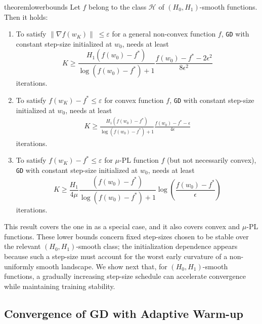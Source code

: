 \documentclass[a4paper,11pt]{article}
\newcommand{\algname}[1]{\texttt{#1}}
\newcommand{\1}{\mathbbm{1}}
\theoremstyle{plain}
\begin{document}
\begin{restatable}{theorem}{lowerbounds}\label{th:lower_bounds}
    Let $f$ belong to the class $\mathcal{H}$ of $(H_0,H_1)$-smooth functions. Then it holds:
\begin{enumerate}
    \item To satisfy $\|\nabla f(w_K)\| \;\leq \varepsilon$ for a general non-convex function $f$, \algname{GD} with constant step-size initialized at $w_0$, needs at least
    \begin{equation*}
        K \geq \frac{H_1 (f(w_0)-f^*)}{\log (f(w_0)-f^*)+1} \frac{f(w_0)-f^*-2 \epsilon^2}{8 \epsilon^2}
    \end{equation*}
    iterations.
     
    
    \item To satisfy $f(w_K)-f^* \leq \varepsilon$ for convex function $f$, \algname{GD} with constant step-size initialized at $w_0$, needs at least
    \begin{align*}
    K \geq \frac{H_1 (f(w_0)-f^*)}{\log(f(w_0)-f^*)+1} \frac{f(w_0)-f^*-\epsilon}{4 \epsilon}
    \end{align*}
    iterations.
     


    \item To satisfy $f(w_K)-f^* \leq \varepsilon$ for $\mu$-PL function $f$ (but not necessarily  convex), \algname{GD} with constant step-size initialized at $w_0$, needs at least
\begin{equation*}
    K \geq \frac{H_1}{4 \mu} \frac{(f(w_0)-f^*)}{\log(f(w_0)-f^*)+1} \log\left(\frac{f(w_0)-f^*}{\epsilon} \right)
\end{equation*}
iterations.
 
    
\end{enumerate}

\end{restatable}

This result covers the one in \citep{zhang2019gradient} as a special case, and it also covers convex and $\mu$-PL functions. These lower bounds concern fixed step-sizes chosen to be stable over the relevant $(H_0, H_1)$-smooth class; the initialization dependence appears because such a step-size must account for the worst early curvature of a non-uniformly smooth landscape. We show next that, for $(H_0, H_1)$-smooth functions, a gradually increasing step-size schedule can accelerate convergence while maintaining training stability.



\subsection{Convergence of GD with Adaptive Warm-up}
\end{document}
